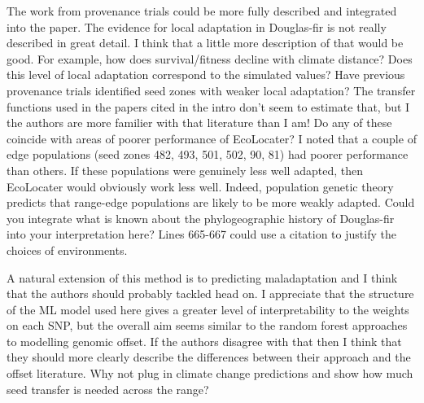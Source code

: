 \begin{point}{} %
The work from provenance trials could be more fully described and integrated into the paper. The evidence for local adaptation in Douglas-fir is not really described in great detail. I think that a little more description of that would be good. For example, how does survival/fitness decline with climate distance? Does this level of local adaptation correspond to the simulated values? Have previous provenance trials identified seed zones with weaker local adaptation? The transfer functions used in the papers cited in the intro don't seem to estimate that, but I the authors are more familier with that literature than I am! Do any of these coincide with areas of poorer performance of EcoLocater? I noted that a couple of edge populations (seed zones 482, 493, 501, 502, 90, 81) had poorer performance than others. If these populations were genuinely less well adapted, then EcoLocater would obviously work less well. Indeed, population genetic theory predicts that range-edge populations are likely to be more weakly adapted. Could you integrate what is known about the phylogeographic history of Douglas-fir into your interpretation here? Lines 665-667 could use a citation to justify the choices of environments.
\end{point}


\begin{point}{} %
A natural extension of this method is to predicting maladaptation and I think that the authors should probably tackled head on. I appreciate that the structure of the ML model used here gives a greater level of interpretability to the weights on each SNP, but the overall aim seems similar to the random forest approaches to modelling genomic offset. If the authors disagree with that then I think that they should more clearly describe the differences between their approach and the offset literature. Why not plug in climate change predictions and show how much seed transfer is needed across the range?
\end{point}


